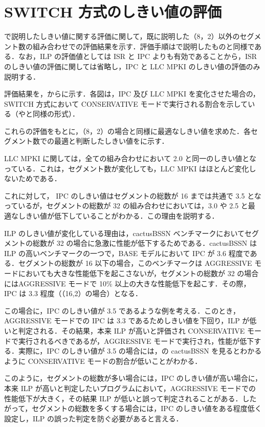 
\chapter{SWITCH 方式のしきい値の評価}
\label{sec:appendix1}

で説明したしきい値に関する評価に関して，既に説明した（8，2）以外のセグメント数の組み合わせでの評価結果を示す．評価手順はで説明したものと同様である．なお，ILP の評価値としては ISR と IPC よりも有効であることから，ISR のしきい値の評価に関しては省略し，IPC と LLC MPKI のしきい値の評価のみ説明する．

評価結果を，からに示す．各図は，IPC 及び  LLC MPKI を変化させた場合の，SWITCH 方式において CONSERVATIVE モードで実行される割合を示している（やと同様の形式）．

これらの評価をもとに，（8，2）の場合と同様に最適なしきい値を求めた．各セグメント数での最適と判断したしきい値をに示す．

LLC MPKI に関しては，全ての組み合わせにおいて 2.0 と同一のしきい値となっている．これは，セグメント数が変化しても，LLC MPKI はほとんど変化しないためである．

これに対して， IPC のしきい値はセグメントの総数が 16 までは共通で 3.5 となっているが，セグメントの総数が 32 の組み合わせにおいては，3.0 や 2.5 と最適なしきい値が低下していることがわかる．この理由を説明する．

ILP のしきい値が変化している理由は，cactusBSSN ベンチマークにおいてセグメントの総数が 32 の場合に急激に性能が低下するためである．cactusBSSN は ILP の高いベンチマークの一つで，BASE モデルにおいて IPC が 3.6 程度である．セグメントの総数が 16 以下の場合，このベンチマークは AGGRESSIVE モードにおいても大きな性能低下を起こさないが，セグメントの総数が 32 の場合にはAGGRESSIVE モードで 10\% 以上の大きな性能低下を起こす．その際，IPC は 3.3 程度（（16,2）の場合）となる．

この場合に，IPC のしきい値が 3.5 であるような例を考える．このとき，AGGRESSIVE モードでの IPC は 3.3 であるためしきい値を下回り，ILP が低いと判定される．その結果，本来 ILP が高いと評価され CONSERVATIVE モードで実行されるべきであるが，AGGRESSIVE モードで実行され，性能が低下する．実際に，IPC のしきい値が 3.5 の場合には，の cactusBSSN を見るとわかるように CONSERVATIVE モードの割合が低いことがわかる．

このように，セグメントの総数が多い場合には，IPC のしきい値が高い場合に，本来 ILP が高いと判定したいプログラムにおいて，AGGRESSIVE モードでの性能低下が大きく，その結果 ILP が低いと誤って判定されることがある．したがって，セグメントの総数を多くする場合には，IPC のしきい値をある程度低く設定し，ILP の誤った判定を防ぐ必要があると言える．

